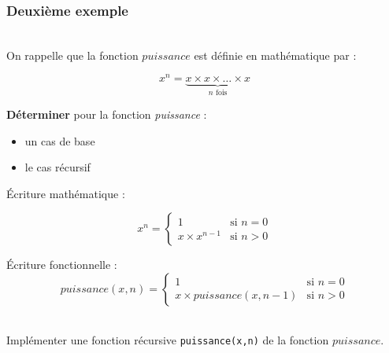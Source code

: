 \documentclass[a4paper,17pt]{extarticle}
\newenvironment{eleve}%
{\begin{activite}\color{noiramu}\\[-0.5cm]}
{\end{activite}}
\providecommand{\tightlist}{%
      \setlength{\itemsep}{0pt}\setlength{\parskip}{0pt}}
\begin{document}
    \hypertarget{deuxiuxe8me-exemple}{%
\subsubsection{Deuxième exemple}\label{deuxiuxe8me-exemple}}
\begin{eleve}
    On rappelle que la fonction \(puissance\) est définie en mathématique
par :

\[
x^n = \underbrace{x \times x \times \ldots \times x}_{n \text{ fois}}
\]

\textbf{Déterminer} pour la fonction \emph{puissance} :

\begin{itemize}
\tightlist
\item
  un cas de base
\item
  le cas récursif
\end{itemize}
        
        \end{eleve}\begin{reponse}
    Écriture mathématique :

\[
x^n = \left\{
    \begin{array}{ll}
        1 & \text{si $n=0$} \\
        x \times x^{n-1}& \text{si $n>0$}
    \end{array}
\right.
\]

Écriture fonctionnelle : \[
puissance(x,n) = \left\{
    \begin{array}{ll}
        1 & \text{si $n=0$} \\
        x \times puissance(x, n-1) & \text{si $n>0$}
    \end{array}
\right.
\]

            \end{reponse}\begin{eleve}
    Implémenter une fonction récursive \texttt{puissance(x,n)} de la
fonction \(puissance\).
        
        \end{eleve}
\end{document}

